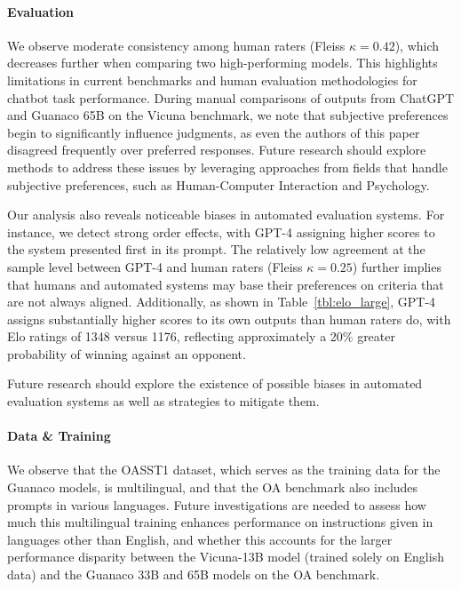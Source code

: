 \paragraph{Evaluation}

We observe moderate consistency among human raters (Fleiss $\kappa=0.42$), which decreases further when comparing two high-performing models. This highlights limitations in current benchmarks and human evaluation methodologies for chatbot task performance. During manual comparisons of outputs from ChatGPT and {Guanaco} 65B on the Vicuna benchmark, we note that subjective preferences begin to significantly influence judgments, as even the authors of this paper disagreed frequently over preferred responses. Future research should explore methods to address these issues by leveraging approaches from fields that handle subjective preferences, such as Human-Computer Interaction and Psychology.

Our analysis also reveals noticeable biases in automated evaluation systems. For instance, we detect strong order effects, with GPT-4 assigning higher scores to the system presented first in its prompt. The relatively low agreement at the sample level between GPT-4 and human raters (Fleiss $\kappa=0.25$) further implies that humans and automated systems may base their preferences on criteria that are not always aligned. Additionally, as shown in Table~\ref{tbl:elo_large}, GPT-4 assigns substantially higher scores to its own outputs than human raters do, with Elo ratings of 1348 versus 1176, reflecting approximately a 20\% greater probability of winning against an opponent.

Future research should explore the existence of possible biases in automated evaluation systems as well as strategies to mitigate them.

\paragraph{Data \& Training} We observe that the OASST1 dataset, which serves as the training data for the {Guanaco} models, is multilingual, and that the OA benchmark also includes prompts in various languages. Future investigations are needed to assess how much this multilingual training enhances performance on instructions given in languages other than English, and whether this accounts for the larger performance disparity between the Vicuna-13B model (trained solely on English data) and the {Guanaco} 33B and 65B models on the OA benchmark.

